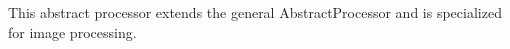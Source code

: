 This abstract processor extends the general  AbstractProcessor and is specialized for image processing.